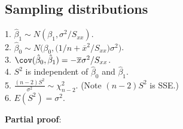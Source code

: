 \documentclass[12pt]{article}
\begin{document}
\subsection{Sampling distributions}

\alert[Theorem]%
1. $\hat{\beta}_1 \sim N(\beta_1, \sigma^2 / S_{xx})$.\\[3pt]
2. $\hat{\beta}_0 \sim N\bigl(\beta_0,
        \bigl(1/n + \overline{x}^2/S_{xx}\bigr)
        \sigma^2\bigr)$.\\[3pt]
3. $\cov(\hat{\beta}_0, \hat{\beta}_1) = -\overline{x} \sigma^2 / S_{xx}$.\\[3pt]
4. $S^2$ is independent of $\hat{\beta}_0$ and $\hat{\beta}_1$.\\[3pt]
5. $\frac{(n-2)S^2}{\sigma^2} \sim \chi^2_{n-2}$.
    (Note $(n-2)S^2$ is SSE.)\\[3pt]
6. $E(S^2) = \sigma^2$.


\textbf{Partial proof}:
\end{document}
